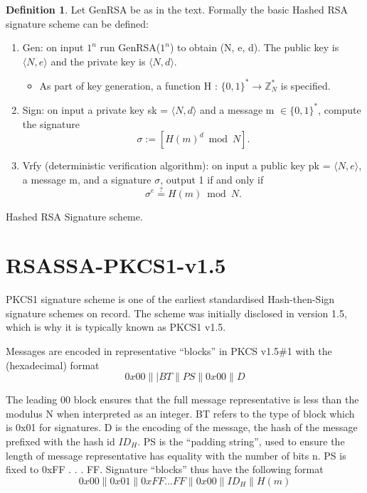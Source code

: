 \documentclass[]{final_report}
\theoremstyle{definition}
\newtheorem{definition}{Definition}[chapter]
\begin{document}
\begin{definition}
\label{def:hashed rsa}
Let GenRSA be as in the text. Formally the basic Hashed RSA signature scheme can be defined:
\begin{enumerate}
    \item Gen: on input $1^n$ run GenRSA($1^n$) to obtain (N, e, d). The public key is $\langle N, e \rangle$ and the private key is $\langle N, d \rangle$.
    \begin{itemize}
    \item As part of key generation, a function H : $\{0, 1\}^* \rightarrow \mathbb{Z}^*_{N}$ is specified.
    \end{itemize}

    \item Sign: on input a private key sk = $\langle N, d \rangle$ and a message m $\in \{0, 1\}^*$, compute the signature
\[\sigma := [H(m)^d \bmod N].\]
    \item Vrfy (deterministic verification algorithm):  on input a public key pk = $\langle N, e \rangle$, a message m, and a signature $\sigma$, output 1 if and only if
    \[\sigma^e \stackrel{?}{=} H(m) \bmod N.\]
\end{enumerate}
Hashed RSA Signature scheme.
\end{definition}


\section{RSASSA-PKCS1-v1.5}
PKCS1 signature scheme is one of the earliest standardised Hash-then-Sign signature schemes on record. The scheme was initially disclosed in version 1.5, which is why it is typically known as PKCS1 v1.5.

Messages are encoded in representative “blocks” in PKCS v1.5\#1 with the (hexadecimal) format
\[0x00\||BT\|PS\|0x00\|D\]

The leading 00 block ensures that the full message representative is less than the modulus N when interpreted as an integer. BT refers to the type of block which is 0x01 for signatures. D is the encoding of the message, the hash of the message prefixed with the hash id $ID_{H}$. PS is the “padding string”, used to ensure the length of message representative has equality with the number of bits n. PS is fixed to 0xFF . . . FF. Signature “blocks” thus have the following format
\[0x00\|0x01\|0xFF . . . FF\|0x00\|ID_{H}\|H(m)\]
\end{document}
